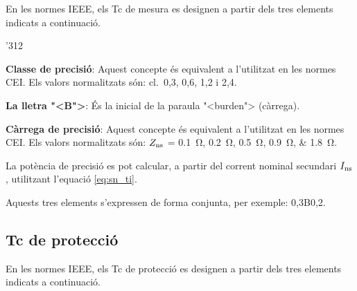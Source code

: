 En les normes \textsf{IEEE}, els Tc de mesura  es designen a partir
dels tres elements indicats a continuaci\'{o}.

\begin{dingautolist}{'312}
    \item \textbf{Classe de precisi\'{o}}: Aquest concepte \'{e}s equivalent
    a l'utilitzat en les normes \textsf{CEI}. Els valors
    normalitzats s\'{o}n: cl.~0,3, 0,6, 1,2 i 2,4.
    \item \textbf{La lletra {"<}B{">}}: \'{E}s la inicial de la paraula
    {"<}burden{">}  (c\`{a}rrega).
    \item \textbf{C\`{a}rrega de precisi\'{o}}: Aquest concepte \'{e}s equivalent
    a l'utilitzat en les normes \textsf{CEI}. Els valors
    normalitzats s\'{o}n: $Z_\mathrm{ns}$ = \SIlist{0,1;0,2;0,5;0,9;1,8}{\ohm}.

    La pot\`{e}ncia de precisi\'{o} es pot calcular, a partir del
    corrent  nominal secundari $I_\mathrm{ns}$, utilitzant l'equaci\'{o}
    \eqref{eq:sn_ti}.
\end{dingautolist}

Aquests tres elements s'expressen de forma conjunta, per exemple:
0,3B0,2.

\subsection{Tc de protecci\'{o}}

En les normes \textsf{IEEE}, els Tc de protecci\'{o} es designen a
partir dels tres elements indicats a continuaci\'{o}.

